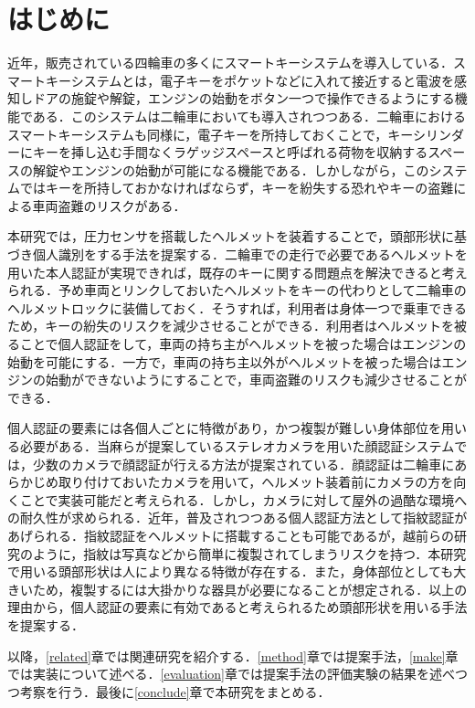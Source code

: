 \chapter{はじめに}
\label{introduction}
近年，販売されている四輪車の多くにスマートキーシステムを導入している．スマートキーシステムとは，電子キーをポケットなどに入れて接近すると電波を感知しドアの施錠や解錠，エンジンの始動をボタン一つで操作できるようにする機能である．このシステムは二輪車においても導入されつつある．二輪車におけるスマートキーシステムも同様に，電子キーを所持しておくことで，キーシリンダーにキーを挿し込む手間なくラゲッジスペースと呼ばれる荷物を収納するスペースの解錠やエンジンの始動が可能になる機能である．しかしながら，このシステムではキーを所持しておかなければならず，キーを紛失する恐れやキーの盗難による車両盗難のリスクがある．\par
本研究では，圧力センサを搭載したヘルメットを装着することで，頭部形状に基づき個人識別をする手法を提案する．二輪車での走行で必要であるヘルメットを用いた本人認証が実現できれば，既存のキーに関する問題点を解決できると考えられる．予め車両とリンクしておいたヘルメットをキーの代わりとして二輪車のヘルメットロックに装備しておく．そうすれば，利用者は身体一つで乗車できるため，キーの紛失のリスクを減少させることができる．利用者はヘルメットを被ることで個人認証をして，車両の持ち主がヘルメットを被った場合はエンジンの始動を可能にする．一方で，車両の持ち主以外がヘルメットを被った場合はエンジンの始動ができないようにすることで，車両盗難のリスクも減少させることができる．\par
個人認証の要素には各個人ごとに特徴があり，かつ複製が難しい身体部位を用いる必要がある．当麻ら\cite{face}が提案しているステレオカメラを用いた顔認証システムでは，少数のカメラで顔認証が行える方法が提案されている．顔認証は二輪車にあらかじめ取り付けておいたカメラを用いて，ヘルメット装着前にカメラの方を向くことで実装可能だと考えられる．しかし，カメラに対して屋外の過酷な環境への耐久性が求められる．近年，普及されつつある個人認証方法として指紋認証があげられる．指紋認証をヘルメットに搭載することも可能であるが，越前ら\cite{finger_print}の研究のように，指紋は写真などから簡単に複製されてしまうリスクを持つ．本研究で用いる頭部形状は人により異なる特徴が存在する．また，身体部位としても大きいため，複製するには大掛かりな器具が必要になることが想定される．以上の理由から，個人認証の要素に有効であると考えられるため頭部形状を用いる手法を提案する．\par
以降，\ref{related}章では関連研究を紹介する．\ref{method}章では提案手法，\ref{make}章では実装について述べる．\ref{evaluation}章では提案手法の評価実験の結果を述べつつ考察を行う．最後に\ref{conclude}章で本研究をまとめる．
